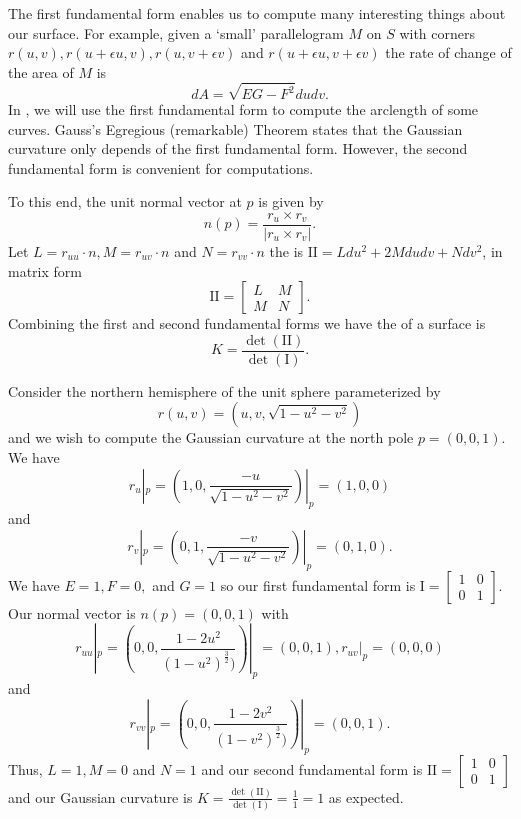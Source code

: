 The first fundamental form enables us to  compute many interesting
things about our surface.
For example,
given a `small' parallelogram $M$ on $S$ with corners $r(u,v),r(u+\epsilon u, v), r(u,v+\epsilon v)$ 
and $r(u+\epsilon u, v+\epsilon v)$ the rate of change of the area of $M$ is 
$$dA=\sqrt{EG-F^2}dudv.$$
In , we will use the first fundamental form to compute the arclength of some curves.
Gauss's Egregious (remarkable) Theorem states that the Gaussian curvature only depends
of the first fundamental form. However, the second fundamental form is convenient for 
computations.

To this end, the unit normal vector at $p$ is given by $$n(p)=\frac{r_u\times r_v}{|r_u\times r_v|}.$$
Let $L=r_{uu}\cdot n, M=r_{uv}\cdot n$ and $N=r_{vv}\cdot n$ the
 is $\mathrm{I\!I}=Ldu^2+2Mdudv+Ndv^2$,
in matrix form $$\mathrm{I\!I}=\begin{bmatrix}
L & M \\
M & N 
\end{bmatrix}.$$
Combining the first and second fundamental forms we have
the  of a surface is
\begin{equation}\label{eqn:curve-dets}
 	K=\frac{\det(\mathrm{I\!I})}{\det(\mathrm{I})}.
\end{equation}

\begin{example}\label{ex:compute-surface-curvature}
Consider the northern hemisphere of the unit sphere parameterized
by $$r(u,v)=(u,v,\sqrt{1-u^2-v^2})$$ and we wish to compute the Gaussian curvature at
the north pole $p=(0,0,1)$.
We have $$r_u|_p=(1,0,\frac{-u}{\sqrt{1-u^2-v^2}})|_p=(1,0,0)$$ and
$$r_v|_p=(0,1,\frac{-v}{\sqrt{1-u^2-v^2}})|_p=(0,1,0).$$
We have $E=1, F=0,$ and $G=1$ so our first fundamental form is
$\mathrm{I}=\begin{bmatrix}
1 & 0 \\
0 & 1 
\end{bmatrix}.$
Our normal vector is $n(p)=(0,0,1)$ with 
$$r_{uu}|_p=(0,0,\frac{1-2u^2}{(1-u^2)^{\frac{3}{2}})})|_p=(0,0,1),
r_{uv}|_p=(0,0,0)$$ and 
$$r_{vv}|_p=(0,0,\frac{1-2v^2}{(1-v^2)^{\frac{3}{2}})})|_p=(0,0,1).$$
Thus, $L=1, M=0$ and $N=1$ and our second fundamental form is
$\mathrm{I\!I}=\begin{bmatrix}
1 & 0 \\
0 & 1 
\end{bmatrix}$
and our Gaussian curvature is $K=\frac{\det(\mathrm{I\!I})}{\det(\mathrm{I})}=\frac{1}{1}=1$ as expected.

\end{example}



